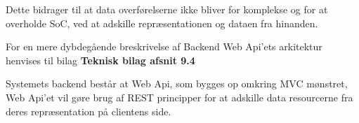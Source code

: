 \noindent Dette bidrager til at data overførelserne ikke bliver for komplekse og for at overholde SoC, ved at adskille repræsentationen og dataen fra hinanden.

For en mere dybdegående breskrivelse af Backend Web Api'ets arkitektur henvises til bilag \textbf{Teknisk bilag afsnit 9.4}

Systemets backend består at Web Api, som bygges op omkring MVC mønstret, Web Api’et vil gøre brug af REST principper for at adskille data resourcerne fra deres repræsentation på clientens side.

\newpage
